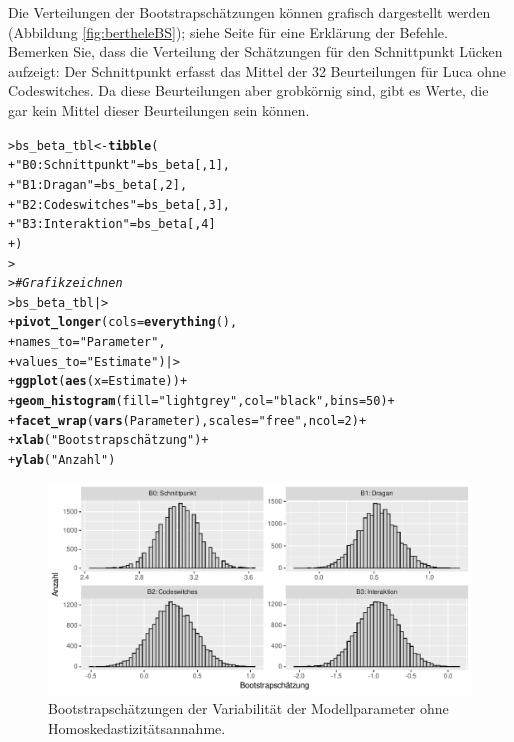 \documentclass[oneside, 10pt]{book}\usepackage[]{graphicx}\usepackage[]{xcolor}
\makeatletter
\newcommand{\hlnum}[1]{\textcolor[rgb]{0.686,0.059,0.569}{#1}}%
\newcommand{\hlstr}[1]{\textcolor[rgb]{0.192,0.494,0.8}{#1}}%
\newcommand{\hlcom}[1]{\textcolor[rgb]{0.678,0.584,0.686}{\textit{#1}}}%
\newcommand{\hlopt}[1]{\textcolor[rgb]{0,0,0}{#1}}%
\newcommand{\hlstd}[1]{\textcolor[rgb]{0.345,0.345,0.345}{#1}}%
\newcommand{\hlkwb}[1]{\textcolor[rgb]{0.69,0.353,0.396}{#1}}%
\newcommand{\hlkwc}[1]{\textcolor[rgb]{0.333,0.667,0.333}{#1}}%
\newcommand{\hlkwd}[1]{\textcolor[rgb]{0.737,0.353,0.396}{\textbf{#1}}}%
\newenvironment{kframe}{%
 \def\at@end@of@kframe{}%
 \ifinner\ifhmode%
  \def\at@end@of@kframe{\end{minipage}}%
  \begin{minipage}{\columnwidth}%
 \fi\fi%
 \def\FrameCommand##1{\hskip\@totalleftmargin \hskip-\fboxsep
 \colorbox{shadecolor}{##1}\hskip-\fboxsep
     \hskip-\linewidth \hskip-\@totalleftmargin \hskip\columnwidth}%
 \MakeFramed {\advance\hsize-\width
   \@totalleftmargin\z@ \linewidth\hsize
   \@setminipage}}%
 {\par\unskip\endMakeFramed%
 \at@end@of@kframe}
\newenvironment{knitrout}{}{} %
\makeatother
\begin{document}
Die Verteilungen der Bootstrapschätzungen können grafisch dargestellt werden (Abbildung \ref{fig:bertheleBS});
siehe Seite \pageref{sec:histogrammebootstrapdekeyser} für eine Erklärung der Befehle.
Bemerken Sie, dass die Verteilung der Schätzungen für den Schnittpunkt Lücken aufzeigt: Der Schnittpunkt erfasst das Mittel der 32 Beurteilungen für Luca ohne Codeswitches. Da diese Beurteilungen aber grobkörnig sind, gibt es Werte, die gar kein Mittel dieser Beurteilungen sein können.
\begin{knitrout}
\color{fgcolor}\begin{kframe}
\begin{alltt}
\hlstd{> }\hlstd{bs_beta_tbl} \hlkwb{<-} \hlkwd{tibble}\hlstd{(}
\hlstd{+ }  \hlstr{"B0: Schnittpunkt"} \hlstd{= bs_beta[,} \hlnum{1}\hlstd{],}
\hlstd{+ }  \hlstr{"B1: Dragan"} \hlstd{= bs_beta[,} \hlnum{2}\hlstd{],}
\hlstd{+ }  \hlstr{"B2: Codeswitches"} \hlstd{= bs_beta[,} \hlnum{3}\hlstd{],}
\hlstd{+ }  \hlstr{"B3: Interaktion"} \hlstd{= bs_beta[,} \hlnum{4}\hlstd{]}
\hlstd{+ }\hlstd{)}
\hlstd{> }
\hlstd{> }\hlcom{# Grafik zeichnen}
\hlstd{> }\hlstd{bs_beta_tbl |>}
\hlstd{+ }  \hlkwd{pivot_longer}\hlstd{(}\hlkwc{cols} \hlstd{=} \hlkwd{everything}\hlstd{(),}
\hlstd{+ }               \hlkwc{names_to} \hlstd{=} \hlstr{"Parameter"}\hlstd{,}
\hlstd{+ }               \hlkwc{values_to} \hlstd{=} \hlstr{"Estimate"}\hlstd{) |>}
\hlstd{+ }  \hlkwd{ggplot}\hlstd{(}\hlkwd{aes}\hlstd{(}\hlkwc{x} \hlstd{= Estimate))} \hlopt{+}
\hlstd{+ }  \hlkwd{geom_histogram}\hlstd{(}\hlkwc{fill} \hlstd{=} \hlstr{"lightgrey"}\hlstd{,} \hlkwc{col} \hlstd{=} \hlstr{"black"}\hlstd{,} \hlkwc{bins} \hlstd{=} \hlnum{50}\hlstd{)} \hlopt{+}
\hlstd{+ }  \hlkwd{facet_wrap}\hlstd{(}\hlkwd{vars}\hlstd{(Parameter),} \hlkwc{scales} \hlstd{=} \hlstr{"free"}\hlstd{,} \hlkwc{ncol} \hlstd{=} \hlnum{2}\hlstd{)} \hlopt{+}
\hlstd{+ }  \hlkwd{xlab}\hlstd{(}\hlstr{"Bootstrapschätzung"}\hlstd{)} \hlopt{+}
\hlstd{+ }  \hlkwd{ylab}\hlstd{(}\hlstr{"Anzahl"}\hlstd{)}
\end{alltt}
\end{kframe}\begin{figure}[tp]

{\centering \includegraphics[width=.8\textwidth]{figs/unnamed-chunk-291-1} 

}

\caption{Bootstrapschätzungen der Variabilität der Modellparameter ohne Homoskedastizitätsannahme.\label{fig:bertheleBS}}\label{fig:unnamed-chunk-291}
\end{figure}

\end{knitrout}
\end{document}
